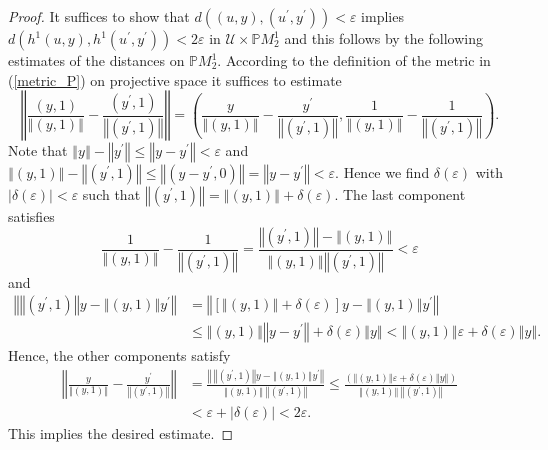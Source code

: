 \documentclass{siamltex}%
\begin{document}
\begin{proof}
It suffices to show that $d((u,y),(u^{\prime},y^{\prime}))<\varepsilon$
implies $d(h^{1}(u,y),h^{1}(u^{\prime},y^{\prime}))<2\varepsilon$ in
$\mathcal{U}\times\mathbb{P}M_{2}^{1}$ and this follows by the following
estimates of the distances on $\mathbb{P}M_{2}^{1}$. According to the
definition of the metric in (\ref{metric_P}) on projective space it suffices
to estimate
\[
\left\Vert \frac{(y,1)}{\left\Vert (y,1)\right\Vert }-\frac{(y^{\prime}%
,1)}{\left\Vert (y^{\prime},1)\right\Vert }\right\Vert =\left(  \frac
{y}{\left\Vert (y,1)\right\Vert }-\frac{y^{\prime}}{\left\Vert (y^{\prime
},1)\right\Vert },\frac{1}{\left\Vert (y,1)\right\Vert }-\frac{1}{\left\Vert
(y^{\prime},1)\right\Vert }\right)  .
\]
Note that $\left\Vert y\right\Vert -\left\Vert y^{\prime}\right\Vert
\leq\left\Vert y-y^{\prime}\right\Vert <\varepsilon$ and $\left\Vert
(y,1)\right\Vert -\left\Vert (y^{\prime},1)\right\Vert \leq\left\Vert
(y-y^{\prime},0)\right\Vert =\left\Vert y-y^{\prime}\right\Vert <\varepsilon$.
Hence we find $\delta(\varepsilon)$ with $\left\vert \delta(\varepsilon
)\right\vert <\varepsilon$ such that $\left\Vert (y^{\prime},1)\right\Vert
=\left\Vert (y,1)\right\Vert +\delta(\varepsilon)$. The last component
satisfies%
\[
\frac{1}{\left\Vert (y,1)\right\Vert }-\frac{1}{\left\Vert (y^{\prime
},1)\right\Vert }=\frac{\left\Vert (y^{\prime},1)\right\Vert -\left\Vert
(y,1)\right\Vert }{\left\Vert (y,1)\right\Vert \left\Vert (y^{\prime
},1)\right\Vert }<\varepsilon
\]
and%
\begin{align*}
\left\Vert \left\Vert (y^{\prime},1)\right\Vert y-\left\Vert (y,1)\right\Vert
y^{\prime}\right\Vert  &  =\left\Vert \left[  \left\Vert (y,1)\right\Vert
+\delta(\varepsilon)\right]  y-\left\Vert (y,1)\right\Vert y^{\prime
}\right\Vert \\
&  \leq\left\Vert (y,1)\right\Vert \left\Vert y-y^{\prime}\right\Vert
+\delta(\varepsilon)\left\Vert y\right\Vert <\left\Vert (y,1)\right\Vert
\varepsilon+\delta(\varepsilon)\left\Vert y\right\Vert .
\end{align*}
Hence, the other components satisfy%
\begin{align*}
\left\Vert \frac{y}{\left\Vert (y,1)\right\Vert }-\frac{y^{\prime}}{\left\Vert
(y^{\prime},1)\right\Vert }\right\Vert  &  =\frac{\left\Vert ~\left\Vert
(y^{\prime},1)\right\Vert y-\left\Vert (y,1)\right\Vert y^{\prime}\right\Vert
}{\left\Vert (y,1)\right\Vert ~\left\Vert (y^{\prime},1)\right\Vert }\leq
\frac{\left(  \left\Vert (y,1)\right\Vert \varepsilon+\delta(\varepsilon
)\left\Vert y\right\Vert \right)  }{\left\Vert (y,1)\right\Vert ~\left\Vert
(y^{\prime},1)\right\Vert }\\
&  <\varepsilon+\left\vert \delta(\varepsilon)\right\vert <2\varepsilon.
\end{align*}
This implies the desired estimate.
\end{proof}
\end{document}

